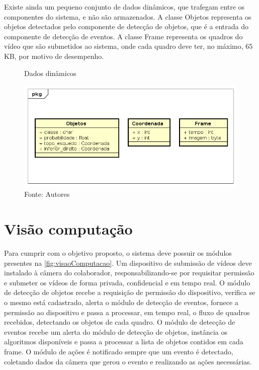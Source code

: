 \documentclass[]{politex}
\begin{document}
Existe ainda um pequeno conjunto de dados dinâmicos, que trafegam entre os componentes do sistema, e não são armazenados. A classe Objetos representa os objetos detectados pelo componente de detecção de objetos, que é a entrada do componente de detecção de eventos. A classe Frame representa os quadros do vídeo que são submetidos ao sistema, onde cada quadro deve ter, no máximo, 65 KB, por motivo de desempenho.

\begin{figure}[H]
    \centering
    \caption{Dados dinâmicos}
    \includegraphics[width=\textwidth]{Visao_info_dinamico}
    \caption*{Fonte: Autores}
    \label{fig:visaoInfomacao_dinamico}
\end{figure}

\section{Visão computação}
Para cumprir com o objetivo proposto, o sistema deve possuir os módulos presentes na \ref{fig:visaoComputacao}. Um dispositivo de submissão de vídeos deve instalado à câmera do colaborador, responsabilizando-se por requisitar permissão e submeter os vídeos de forma privada, confidencial e em tempo real. O módulo de detecção de objetos recebe a requisição de permissão do dispositivo, verifica se o mesmo está cadastrado, alerta o módulo de detecção de eventos, fornece a permissão ao dispositivo e passa a processar, em tempo real, o fluxo de quadros recebidos, detectando os objetos de cada quadro. O módulo de detecção de eventos recebe um alerta do módulo de detecção de objetos, instância os algoritmos disponíveis e passa a processar a lista de objetos contidos em cada frame. O módulo de ações é notificado sempre que um evento é detectado, coletando dados da câmera que gerou o evento e realizando as ações necessárias.
\end{document}

